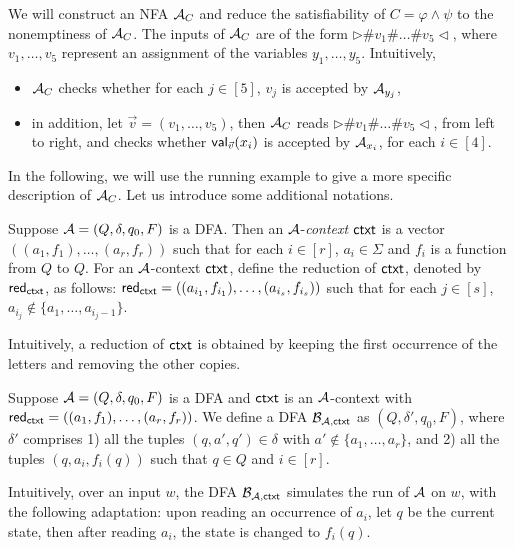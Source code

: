 \documentclass{llncs}
\begin{document}
We will construct an NFA $\mathcal{A}_C$ and reduce the satisfiability of $C=\varphi \wedge \psi$ to the nonemptiness of $\mathcal{A}_C$. The inputs of $\mathcal{A}_C$ are of the form $\triangleright \# v_1 \# \dots \# v_5\triangleleft$, where $v_1,\dots, v_5$ represent an assignment of the variables $y_1,\dots, y_5$. Intuitively, 
\begin{itemize}
\item 
 $\mathcal{A}_C$ checks whether for each $j \in [5]$, $v_j$ is accepted by $\mathcal{A}_{y_j}$, 
\item 
in addition, let $\vec{v} = (v_1,\dots, v_5)$, then $\mathcal{A}_C$ reads $\triangleright \# v_1 \# \dots \# v_5\triangleleft$, from left to right, and checks whether $\mathsf{val}_{\vec{v}}(x_i)$ is accepted by $\mathcal{A}_{x_i}$, for each $i \in [4]$.
\end{itemize}

In the following, we will use the running example to give a more specific description of $\mathcal{A}_C$. Let us introduce some additional notations.

\begin{definition}
Suppose $\mathcal{A}=(Q, \delta, q_0, F)$ is a DFA. Then an $\mathcal{A}$-\emph{context} $\mathsf{ctxt}$  is a vector $((a_1,f_1),\dots, (a_r, f_r))$ such that for each $i \in [r]$, $a_i \in \Sigma$ and $f_i$ is a function from $Q$ to $Q$. 
For an $\mathcal{A}$-context $\mathsf{ctxt}$, define the reduction of $\mathsf{ctxt}$, denoted by $\mathsf{red}_{\mathsf{ctxt}}$, as follows: $\mathsf{red}_{\mathsf{ctxt}} = ((a_{i_1},f_{i_1}), \dots, (a_{i_s}, f_{i_s}))$ such that for each $j \in [s]$, $a_{i_j} \not \in \{a_1,\dots, a_{i_j-1}\}$. 
\end{definition}
Intuitively, a reduction of $\mathsf{ctxt}$ is obtained by keeping the first occurrence of the letters and removing the other copies.

\begin{definition}
Suppose $\mathcal{A}=(Q, \delta, q_0, F)$ is a DFA and $\mathsf{ctxt}$ is an $\mathcal{A}$-context with $\mathsf{red}_{\mathsf{ctxt}}= ((a_1,f_1),\dots ,(a_r, f_r))$. We define a DFA $\mathcal{B}_{\mathcal{A}, \mathsf{ctxt}}$ as $(Q, \delta', q_0, F)$, where $\delta'$ comprises 1) all the tuples $(q, a', q') \in \delta$ with $a' \not \in \{a_1,\dots, a_r\}$, and 2) all the tuples $(q, a_i, f_i(q))$ such that $q \in Q$ and $i \in [r]$.
\end{definition}
Intuitively, over an input $w$, the DFA $\mathcal{B}_{\mathcal{A}, \mathsf{ctxt}}$ simulates the run of $\mathcal{A}$ on $w$, with the following adaptation: upon reading an occurrence of $a_i$, let $q$ be the current state, then after reading $a_i$, the state is changed to $f_i(q)$.
\end{document}
